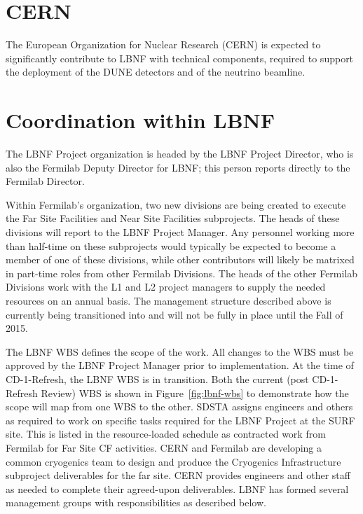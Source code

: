 \section{CERN}

The European Organization for Nuclear Research (CERN) is expected to significantly contribute to LBNF with technical components, required to support the deployment of the DUNE detectors and of the neutrino beamline. 

\section{Coordination within LBNF}

The LBNF Project organization is headed by the LBNF Project Director, who is also the Fermilab Deputy Director for LBNF; this person reports directly to the Fermilab Director. 

Within Fermilab's organization, two new divisions are being created to execute the Far Site Facilities and Near Site Facilities subprojects. The heads of these divisions will report to the LBNF Project Manager. 
Any personnel working more than half-time on these subprojects would typically be expected to become a member of one of these divisions, while other contributors will likely be matrixed in part-time roles from other Fermilab Divisions.  The heads of the other Fermilab Divisions work with the L1 and L2 project managers to supply the needed resources on an annual basis.  The management structure described above is currently being transitioned into and will not be fully in place until the Fall of 2015.  

The LBNF WBS defines the scope of the work. All changes to the WBS must be approved by the LBNF Project Manager prior to implementation. At the time of CD-1-Refresh, the LBNF WBS is in transition. Both the current (post CD-1-Refresh Review) WBS is shown in Figure~\ref{fig:lbnf-wbs} to demonstrate how the scope will map from one WBS to the other. 
SDSTA assigns engineers and others as required to work on specific tasks required for the LBNF Project at the SURF site. This is listed in the resource-loaded schedule as contracted work from Fermilab for Far Site CF activities. 
CERN and Fermilab are developing a common cryogenics team to design and produce the Cryogenics Infrastructure subproject deliverables for the far site. CERN provides engineers and other staff as needed to complete their agreed-upon deliverables.  
LBNF has formed several management groups with responsibilities as described below.

